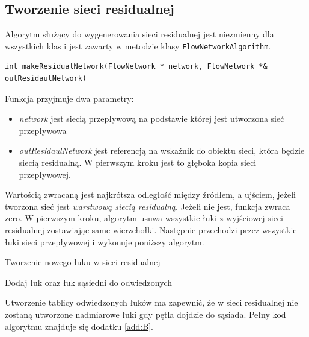 \subsection{Tworzenie sieci residualnej}\label{ssec:tworzenieSieciResAlg}
Algorytm służący do wygenerowania sieci residualnej jest niezmienny dla wszystkich klas i jest zawarty w metodzie klasy \lstinline|FlowNetworkAlgorithm|.
\begin{verbatim}
int makeResidualNetwork(FlowNetwork * network, FlowNetwork *& outResidaulNetwork)
\end{verbatim}
Funkcja przyjmuje dwa parametry:
\begin{itemize}
	\item \emph{network} jest siecią przepływową na podstawie której jest utworzona sieć przepływowa
	\item \emph{outResidaulNetwork} jest referencją na wskaźnik do obiektu sieci, która będzie siecią residualną. W pierwszym kroku jest to głęboka kopia sieci przepływowej.
\end{itemize}
Wartością zwracaną jest najkrótsza odległość między źródłem, a ujściem, jeżeli tworzona sieć jest \textit{warstwową siecią residualną}. Jeżeli nie jest, funkcja zwraca zero. W pierwszym kroku, algorytm usuwa wszystkie łuki z wyjściowej sieci residualnej zostawiając same wierzchołki. Następnie przechodzi przez wszystkie łuki sieci przepływowej i wykonuje poniższy algorytm.
\begin{algorithm}
	\caption{Tworzenie nowego łuku w sieci residualnej}\label{siecResidualnaPseudo}
	\begin{algorithmic}
				\State Dodaj łuk oraz łuk sąsiedni do odwiedzonych
			\EndIf
			\EndIf
			\EndIf
		\EndProcedure
	\end{algorithmic}
\end{algorithm}
Utworzenie tablicy odwiedzonych łuków ma zapewnić, że w sieci residualnej nie zostaną utworzone nadmiarowe łuki gdy pętla dojdzie do sąsiada. Pełny kod algorytmu znajduje się dodatku \ref{add:B}.
